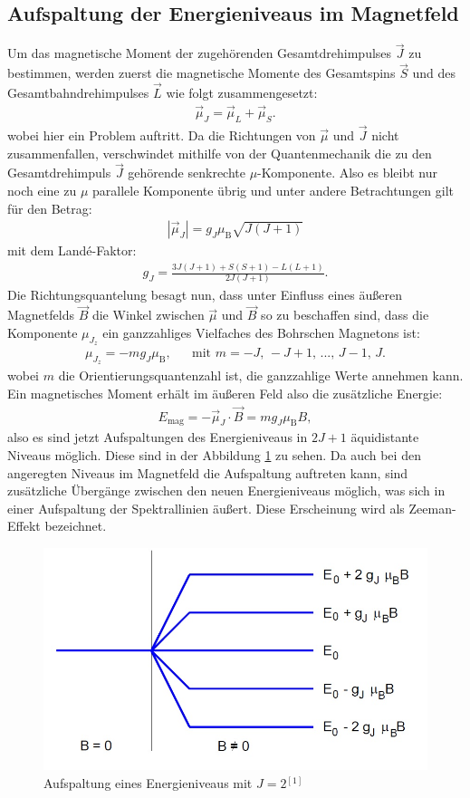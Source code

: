\documentclass{article}
\begin{document}
	\subsection{Aufspaltung der Energieniveaus im Magnetfeld}
	Um das magnetische Moment der zugehörenden Gesamtdrehimpulses $\vec{J}$ zu bestimmen, werden zuerst die magnetische Momente des Gesamtspins $\vec{S} $ und des Gesamtbahndrehimpulses $\vec{L}$ wie folgt zusammengesetzt:
	\begin{align}
	\vec{\mu}_J=\vec{\mu}_L+\vec{\mu}_S.
	\end{align} 
	wobei hier ein Problem auftritt. Da die Richtungen von $\vec{\mu}$ und $\vec{J}$ nicht zusammenfallen, verschwindet mithilfe von der Quantenmechanik die zu den Gesamtdrehimpuls $\vec{J}$ gehörende senkrechte $\mu$-Komponente. Also es bleibt nur noch eine zu $\mu$ parallele Komponente übrig und unter andere Betrachtungen gilt für den Betrag:
	\begin{align}
	|\vec{\mu}_J|=g_J\mu_\text{B}\sqrt{J(J+1)}
	\end{align}
	mit dem Landé-Faktor:
	\begin{align}
	g_J=\frac{3J(J+1)+S(S+1)-L(L+1)}{2J(J+1)}. \label{eqn:lande}
	\end{align}
	Die Richtungsquantelung besagt nun, dass unter Einfluss eines äußeren Magnetfelds $\vec{B}$ die Winkel zwischen $\vec{\mu}$ und $\vec{B}$ so zu beschaffen sind, dass die Komponente $\mu_{J_z}$ ein ganzzahliges Vielfaches des Bohrschen Magnetons ist:
	\begin{align}
	\mu_{J_z}=-mg_J\mu_\text{B}, &&\text{mit } m=-J,\,-J+1,\,...,\,J-1,\,J.
	\end{align}
	wobei $m$ die Orientierungsquantenzahl ist, die ganzzahlige Werte annehmen kann. Ein magnetisches Moment erhält im äußeren Feld also die zusätzliche Energie: 
	\begin{align}
	E_\text{mag}=-\vec{\mu}_J\cdot\vec{B}=mg_J\mu_\text{B}B,
	\label{eqn:emag}
	\end{align}
	also es sind jetzt Aufspaltungen des Energieniveaus in $2J+1$ äquidistante Niveaus möglich. Diese sind in der Abbildung \ref{fig:aufspaltungbeispiel} zu sehen. Da auch bei den angeregten Niveaus im Magnetfeld die Aufspaltung auftreten kann, sind zusätzliche Übergänge zwischen den neuen Energieniveaus möglich, was sich in einer Aufspaltung der Spektrallinien äußert. Diese Erscheinung wird als Zeeman-Effekt bezeichnet.
	\begin{figure}[h!]
		\centering
		\includegraphics[width=0.7\linewidth]{AufspaltungBeispiel.jpg}
		\caption{Aufspaltung eines Energieniveaus mit $J = 2$$^{[1]}$} %
		\label{fig:aufspaltungbeispiel}
	\end{figure}
	
\end{document}
